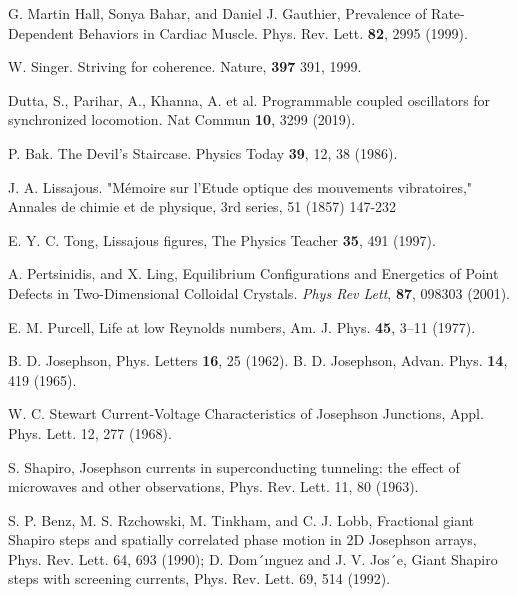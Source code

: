 \documentclass[twocolumn,preprintnumbers,amsmath,amssymb,aps,prx]{revtex4}
\begin{document}
\begin{thebibliography}{99}
   G. Martin Hall, Sonya Bahar, and Daniel J. Gauthier, Prevalence of Rate-Dependent Behaviors in Cardiac Muscle. Phys. Rev. Lett. {\bf 82}, 2995 (1999).

   W. Singer. Striving for coherence. Nature, {\bf 397} 391, 1999.

     Dutta, S., Parihar, A., Khanna, A. et al. Programmable coupled oscillators for synchronized locomotion. Nat Commun {\bf 10}, 3299 (2019).
    
     P. Bak. The Devil's Staircase. Physics Today {\bf 39}, 12, 38 (1986).

     J. A. Lissajous.  "Mémoire sur l'Etude optique des mouvements vibratoires,"  Annales de chimie et de physique, 3rd series, 51 (1857) 147-232

     E. Y. C. Tong, Lissajous figures, The Physics Teacher {\bf 35}, 491 (1997).

       A. Pertsinidis, and X. Ling,  Equilibrium Configurations and Energetics of Point Defects in Two-Dimensional Colloidal Crystals. {\it Phys Rev Lett}, {\bf 87}, 098303 (2001). %
      
     E. M. Purcell, Life at low Reynolds numbers, Am. J. Phys. {\bf 45}, 3–11 (1977).


     B. D. Josephson, Phys. Letters {\bf 16}, 25 (1962). 
     B. D. Josephson, Advan. Phys. {\bf 14}, 419 (1965).

      W. C. Stewart Current‐Voltage Characteristics of Josephson Junctions, Appl. Phys. Lett. 12, 277 (1968).
      
     S. Shapiro, Josephson currents in superconducting tunneling: the effect of microwaves and other observations, Phys. Rev. Lett. 11, 80 (1963).

      S. P. Benz, M. S. Rzchowski, M. Tinkham, and C. J. Lobb, Fractional giant Shapiro steps and spatially correlated phase motion in 2D Josephson arrays, Phys. Rev. Lett. 64, 693 (1990); D. Dom´ınguez and J. V. Jos´e, Giant Shapiro steps with screening currents, Phys. Rev. Lett. 69,
514 (1992).


\end{thebibliography}
\end{document}
